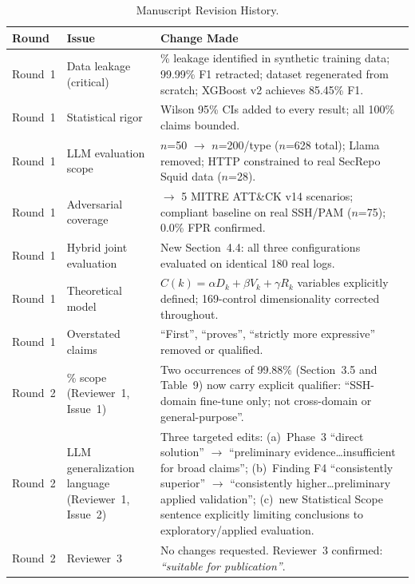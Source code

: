 \documentclass[11pt,a4paper]{article}
\begin{document}
\begin{table}[H]
\centering
\caption{Manuscript Revision History.}
\label{tab:revision-history}
\small
\setlength{\tabcolsep}{5pt}
\begin{tabular}{>{\RaggedRight\arraybackslash}p{1.6cm}
                >{\RaggedRight\arraybackslash}p{3.5cm}
                >{\RaggedRight\arraybackslash}p{9.0cm}}
\toprule
\textbf{Round} & \textbf{Issue} & \textbf{Change Made} \\
\midrule
Round~1 & Data leakage (critical) &
  86.3\% leakage identified in synthetic training data; 99.99\% F1 retracted;
  dataset regenerated from scratch; XGBoost v2 achieves 85.45\% F1. \\
\addlinespace
Round~1 & Statistical rigor &
  Wilson 95\% CIs added to every result; all 100\% claims bounded. \\
\addlinespace
Round~1 & LLM evaluation scope &
  $n$=50 $\to$ $n$=200/type ($n$=628 total); Llama removed; HTTP constrained
  to real SecRepo Squid data ($n$=28). \\
\addlinespace
Round~1 & Adversarial coverage &
  2 $\to$ 5 MITRE ATT\&CK v14 scenarios; compliant baseline on real SSH/PAM
  ($n$=75); 0.0\% FPR confirmed. \\
\addlinespace
Round~1 & Hybrid joint evaluation &
  New Section~4.4: all three configurations evaluated on identical 180 real logs. \\
\addlinespace
Round~1 & Theoretical model &
  $C(k) = \alpha D_k + \beta V_k + \gamma R_k$ variables explicitly defined;
  169-control dimensionality corrected throughout. \\
\addlinespace
Round~1 & Overstated claims &
  ``First'', ``proves'', ``strictly more expressive'' removed or qualified. \\
\midrule
Round~2 & 99.88\% scope (Reviewer~1, Issue~1) &
  Two occurrences of 99.88\% (Section~3.5 and Table~9) now carry explicit
  qualifier: ``SSH-domain fine-tune only; not cross-domain or general-purpose''. \\
\addlinespace
Round~2 & LLM generalization language (Reviewer~1, Issue~2) &
  Three targeted edits: (a)~Phase~3 ``direct solution'' $\to$ ``preliminary
  evidence\ldots insufficient for broad claims''; (b)~Finding F4 ``consistently
  superior'' $\to$ ``consistently higher\ldots preliminary applied validation'';
  (c)~new Statistical Scope sentence explicitly limiting conclusions to
  exploratory/applied evaluation. \\
\addlinespace
Round~2 & Reviewer~3 &
  No changes requested. Reviewer~3 confirmed: \textit{``suitable for publication''}. \\
\bottomrule
\end{tabular}
\end{table}
\end{document}
